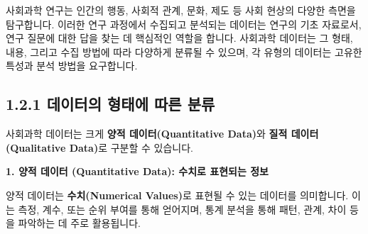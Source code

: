 \documentclass[
  letterpaper,
]{book}
\begin{document}
사회과학 연구는 인간의 행동, 사회적 관계, 문화, 제도 등 사회 현상의
다양한 측면을 탐구합니다. 이러한 연구 과정에서 수집되고 분석되는
데이터는 연구의 기초 자료로서, 연구 질문에 대한 답을 찾는 데 핵심적인
역할을 합니다. 사회과학 데이터는 그 형태, 내용, 그리고 수집 방법에 따라
다양하게 분류될 수 있으며, 각 유형의 데이터는 고유한 특성과 분석 방법을
요구합니다.

\subsection{1.2.1 데이터의 형태에 따른
분류}\label{uxb370uxc774uxd130uxc758-uxd615uxd0dcuxc5d0-uxb530uxb978-uxbd84uxb958}

사회과학 데이터는 크게 \textbf{양적 데이터(Quantitative Data)}와
\textbf{질적 데이터(Qualitative Data)}로 구분할 수 있습니다.

\textbf{1. 양적 데이터 (Quantitative Data): 수치로 표현되는 정보}

양적 데이터는 \textbf{수치(Numerical Values)}로 표현될 수 있는 데이터를
의미합니다. 이는 측정, 계수, 또는 순위 부여를 통해 얻어지며, 통계 분석을
통해 패턴, 관계, 차이 등을 파악하는 데 주로 활용됩니다.
\end{document}
